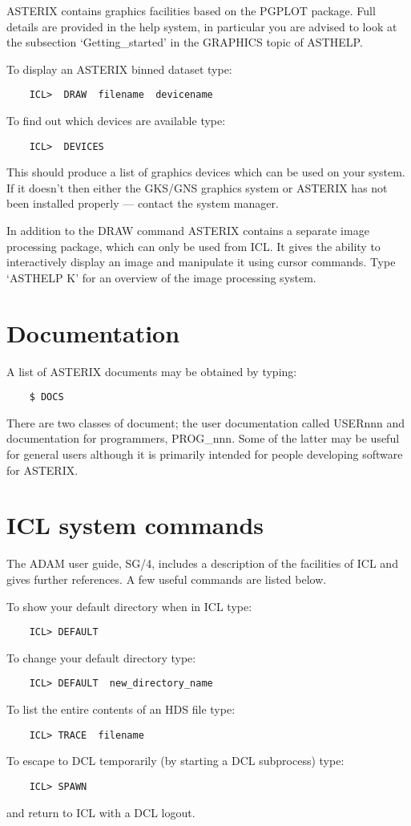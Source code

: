 ASTERIX contains graphics facilities based on the PGPLOT package.  Full
details are provided in the help system, in particular you are advised
to look at the subsection `Getting\_started' in the GRAPHICS topic of
ASTHELP. 

To display an ASTERIX binned dataset type:  
\begin{verbatim}
    ICL>  DRAW  filename  devicename
\end{verbatim}
To find out which devices are available type: 
\begin{verbatim}
    ICL>  DEVICES 
\end{verbatim}
This should produce a list of graphics devices which can be used
on your system. If it doesn't then either the GKS/GNS graphics system
or ASTERIX has not been installed properly --- contact the system manager.

In addition to the DRAW command ASTERIX contains a separate image
processing package, which can only be used from ICL. It gives the 
ability to interactively display an image and manipulate it using
cursor commands. Type `ASTHELP K' for an overview of the image
processing system.

\section{Documentation }

A list of ASTERIX documents may be obtained by typing:
\begin{verbatim}
    $ DOCS
\end{verbatim}
There are two classes of document; the user documentation called USERnnn
and documentation for programmers, PROG\_nnn. Some of the latter may
be useful for general users although it is primarily intended for people
developing software for ASTERIX.

\section{ICL system commands }

The ADAM user guide, SG/4, includes a description of the facilities
of ICL and gives further references.
A few useful commands are listed below.

To show your default directory when in ICL type:
\begin{verbatim}
    ICL> DEFAULT
\end{verbatim}
To change your default directory type:
\begin{verbatim}
    ICL> DEFAULT  new_directory_name
\end{verbatim}
To list the entire contents of an HDS file type:
\begin{verbatim}
    ICL> TRACE  filename
\end{verbatim}
To escape to DCL temporarily (by starting a DCL subprocess) type:
\begin{verbatim}
    ICL> SPAWN 
\end{verbatim}
and return to ICL with a DCL logout.


